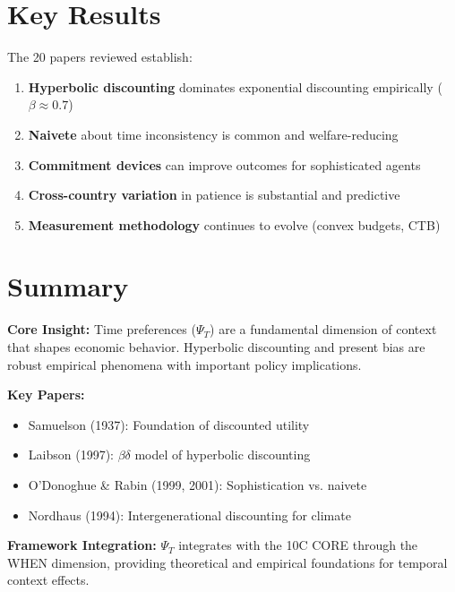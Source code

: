 \section{Key Results}
\label{sec:ctm-results}

The 20 papers reviewed establish:

\begin{enumerate}
    \item \textbf{Hyperbolic discounting} dominates exponential discounting empirically ($\beta \approx 0.7$)
    \item \textbf{Naivete} about time inconsistency is common and welfare-reducing
    \item \textbf{Commitment devices} can improve outcomes for sophisticated agents
    \item \textbf{Cross-country variation} in patience is substantial and predictive
    \item \textbf{Measurement methodology} continues to evolve (convex budgets, CTB)
\end{enumerate}


\section{Summary}
\label{sec:ctm-summary}

\begin{tcolorbox}[colback=gray!5!white, colframe=gray!75!black,
    title=Appendix CTM Summary: Temporal Context]

\textbf{Core Insight:}
Time preferences ($\Psi_T$) are a fundamental dimension of context that shapes economic behavior. Hyperbolic discounting and present bias are robust empirical phenomena with important policy implications.

\textbf{Key Papers:}
\begin{itemize}[nosep]
    \item Samuelson (1937): Foundation of discounted utility
    \item Laibson (1997): $\beta\delta$ model of hyperbolic discounting
    \item O'Donoghue \& Rabin (1999, 2001): Sophistication vs. naivete
    \item Nordhaus (1994): Intergenerational discounting for climate
\end{itemize}

\textbf{Framework Integration:}
$\Psi_T$ integrates with the 10C CORE through the WHEN dimension, providing theoretical and empirical foundations for temporal context effects.

\end{tcolorbox}


